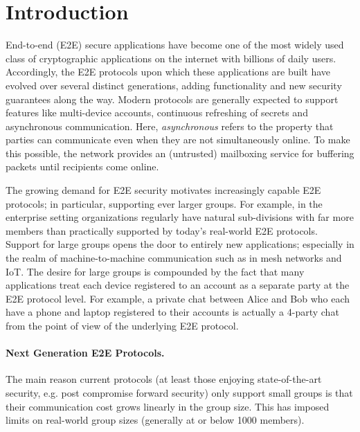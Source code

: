 

\section{Introduction}
End-to-end (E2E) secure applications have become one of the most widely used
class of cryptographic applications on the internet with billions of daily
users. Accordingly, the E2E protocols upon which these applications are built
have evolved over several distinct generations, adding functionality and new
security guarantees along the way. Modern protocols are generally expected to
support features like multi-device accounts, continuous refreshing of secrets
and asynchronous communication. Here, \emph{asynchronous} refers to the
property that parties can communicate even when they are not simultaneously
online. To make this possible, the network provides an (untrusted) mailboxing
service for buffering packets until recipients come online.

The growing demand for E2E security motivates increasingly capable E2E
protocols; in particular, supporting ever larger groups. For example, in the
enterprise setting organizations regularly have natural sub-divisions with
far more members than practically supported by today's real-world E2E
protocols. Support for large groups opens the door to entirely new
applications; especially in the realm of machine-to-machine communication
such as in mesh networks and IoT. The desire for large groups is compounded
by the fact that many applications treat each device registered to an account
as a separate party at the E2E protocol level. For example, a private chat
between Alice and Bob who each have a phone and laptop registered to their
accounts is actually a 4-party chat from the point of view of the underlying
E2E protocol.

\paragraph{Next Generation E2E Protocols.}
The main reason current protocols (at least those enjoying state-of-the-art
security, {e.g. post compromise forward security}) only support small groups
is that their communication cost grows linearly in the group size. This
has imposed limits on real-world group sizes (generally at or below
1000 members).

